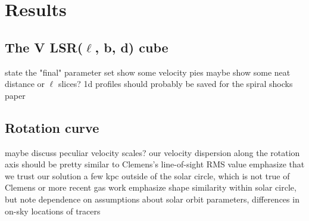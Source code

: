 \section{Results}

\subsection{The V LSR($\ell$, b, d) cube}
state the "final" parameter set
show some velocity pies
maybe show some neat distance or $\ell$ slices? 1d profiles should probably be saved for the spiral shocks paper

\subsection{Rotation curve}
maybe discuss peculiar velocity scales? our velocity dispersion along the rotation axis should be pretty similar to Clemens’s line-of-sight RMS value emphasize that we trust our solution a few kpc outside of the solar circle, which is not true of Clemens or more recent gas work emphasize shape similarity within solar circle, but note dependence on assumptions about solar orbit parameters, differences in on-sky locations of tracers
